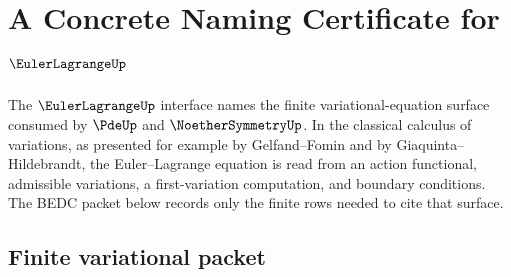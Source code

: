 \chapter{A Concrete Naming Certificate for $\EulerLagrangeUp$}
\label{ch:concrete-instances-eulerlagrange-namecert}

The $\EulerLagrangeUp$ interface names the finite variational-equation surface consumed by $\PdeUp$ and $\NoetherSymmetryUp$. In the classical calculus of variations, as presented for example by Gelfand--Fomin and by Giaquinta--Hildebrandt, the Euler--Lagrange equation is read from an action functional, admissible variations, a first-variation computation, and boundary conditions. The BEDC packet below records only the finite rows needed to cite that surface.

\section{Finite variational packet}
\label{sec:eulerlagrange-finite-variational-packet}


